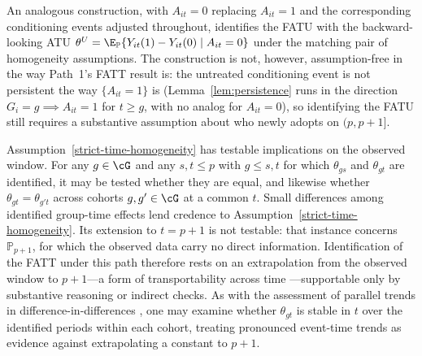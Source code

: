 \documentclass{article}
\renewcommand{\P}{\mathbb{P}}
\begin{document}
\begin{remark}
    An analogous construction, with $A_{it} = 0$ replacing $A_{it} = 1$ and the corresponding conditioning events adjusted throughout, identifies the FATU with the backward-looking ATU $\theta^U = \E_\P\{Y_{it}(1) - Y_{it}(0) \mid A_{it} = 0\}$ under the matching pair of homogeneity assumptions. The construction is not, however, assumption-free in the way Path~1's FATT result is: the untreated conditioning event is not persistent the way $\{A_{it}=1\}$ is (Lemma~\ref{lem:persistence} runs in the direction $G_i=g \implies A_{it}=1$ for $t\ge g$, with no analog for $A_{it}=0$), so identifying the FATU still requires a substantive assumption about who newly adopts on $(p,p+1]$.
\end{remark}

\begin{remark}\label{rem:testable}
Assumption~\ref{strict-time-homogeneity} has testable implications on the observed window. For any $g \in \cG$ and any $s,t \leq p$ with $g \leq s,t$ for which $\theta_{gs}$ and $\theta_{gt}$ are identified, it may be tested whether they are equal, and likewise whether $\theta_{gt} = \theta_{g't}$ across cohorts $g,g' \in \cG$ at a common $t$. Small differences among identified group-time effects lend credence to Assumption~\ref{strict-time-homogeneity}. Its extension to $t = p+1$ is not testable: that instance concerns $\P_{p+1}$, for which the observed data carry no direct information. Identification of the FATT under this path therefore rests on an extrapolation from the observed window to $p+1$---a form of transportability across time \citep{pearlExternalValidityCalculus2022,egamiElementsExternalValidity2023}---supportable only by substantive reasoning or indirect checks. As with the assessment of parallel trends in difference-in-differences \citep{sunEstimatingDynamicTreatment2021,wangAdvancesDifferenceindifferencesMethods2024a}, one may examine whether $\theta_{gt}$ is stable in $t$ over the identified periods within each cohort, treating pronounced event-time trends as evidence against extrapolating a constant to $p+1$.
\end{remark}
\end{document}
